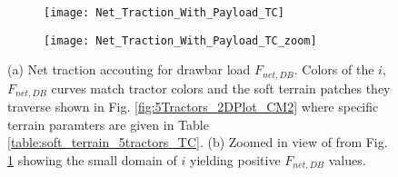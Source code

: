 \begin{figure}[tp]
\begin{subfigure}{0.5\textwidth}
\texttt{[image: Net\_Traction\_With\_Payload\_TC]}
\caption{}
\label{fig:Net_Traction_With_Payload_TC}
\end{subfigure}
\begin{subfigure}{0.5\textwidth}
\texttt{[image: Net\_Traction\_With\_Payload\_TC\_zoom]}
\caption{}
\label{fig:Net_Traction_With_Payload_TC_zoom}
\end{subfigure}
\caption{(a) Net traction accouting for drawbar load $F_{net,DB}$. Colors of the $i$, $F_{net,DB}$ curves match tractor colors and the soft terrain patches they traverse shown in Fig. \ref{fig:5Tractors_2DPlot_CM2} where specific terrain paramters are given in Table \ref{table:soft_terrain_5tractors_TC}. (b) Zoomed in view of from Fig. \ref{fig:Net_Traction_With_Payload_TC} showing the small domain of $i$ yielding positive $F_{net,DB}$ values. }
\label{fig:Net_Traction_With_Payload_TC_Both}
\end{figure}
